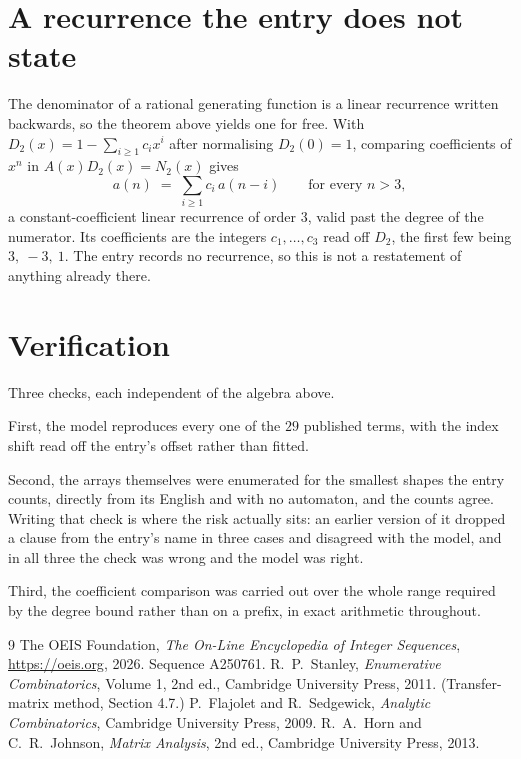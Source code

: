 \documentclass[11pt,a4paper]{article}
\theoremstyle{plain}
\theoremstyle{definition}
\begin{document}
\section{A recurrence the entry does not state}

The denominator of a rational generating function is a linear recurrence written backwards, so
the theorem above yields one for free. With $D_2(x)=1-\sum_{i\ge1}c_ix^i$ after normalising
$D_2(0)=1$, comparing coefficients of $x^n$ in $A(x)D_2(x)=N_2(x)$ gives
\[
a(n)\;=\;\sum_{i\ge1}c_i\,a(n-i)\qquad\text{for every }n>3,
\]
a constant-coefficient linear recurrence of order $3$, valid past the degree of the
numerator. Its coefficients are the integers $c_1,\dots,c_{3}$ read off $D_2$, the first few being $3,\ -3,\ 1$. The entry records no recurrence, so this is not a restatement of anything
already there.

\section{Verification}

Three checks, each independent of the algebra above.

First, the model reproduces every one of the $29$ published terms, with the index shift
read off the entry's offset rather than fitted.

Second, the arrays themselves were enumerated for the smallest shapes the entry counts,
directly from its English and with no automaton, and the counts agree. Writing that check is
where the risk actually sits: an earlier version of it dropped a clause from the entry's name
in three cases and disagreed with the model, and in all three the check was wrong and the model
was right.

Third, the coefficient comparison was carried out over the whole range required by the degree
bound rather than on a prefix, in exact arithmetic throughout.

\begin{thebibliography}{9}
 The OEIS Foundation, \emph{The On-Line Encyclopedia of Integer
Sequences}, \url{https://oeis.org}, 2026. Sequence A250761.
 R.~P.~Stanley, \emph{Enumerative Combinatorics}, Volume 1, 2nd ed.,
Cambridge University Press, 2011. (Transfer-matrix method, Section 4.7.)
 P.~Flajolet and R.~Sedgewick, \emph{Analytic Combinatorics}, Cambridge
University Press, 2009.
 R.~A.~Horn and C.~R.~Johnson, \emph{Matrix Analysis}, 2nd ed., Cambridge
University Press, 2013.
\end{thebibliography}
\end{document}
